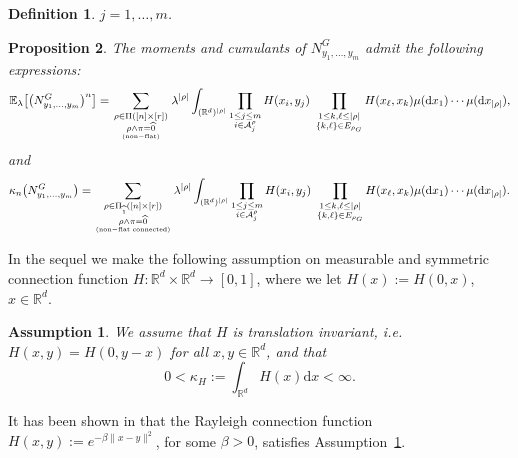 \documentclass[12pt]{article}
\newtheorem{assumption}{Assumption}[section]
\newcommand{\R}{\mathbb{R}}
\newcommand{\E}{\mathbb{E}}
\newtheorem{prop}{Proposition}[section]
\newtheorem{definition}[prop]{Definition}
\def\real{{\mathord{\mathbb R}}}
\numberwithin{equation}{section}
\begin{document}
{\begin{definition}
  $j=1,\ldots , m$.
   \end{definition}
   \begin{prop}
    \label{mom-cumfor}
     The moments and cumulants of $N_{y_1,\ldots , y_m}^G$ admit
     the following expressions: 
    $$
      \E_\lambda \big[\big(N_{y_1,\ldots , y_m}^G\big)^n\big]=
      \sum_{\substack{\rho\in\Pi ([n]\times[r])
          \\\rho\wedge\pi=\widehat{0}} \atop {\rm (non-flat)}}
      \lambda^{|\rho |}
      \int_{(\R^d)^{|\rho|}}\prod_{\substack{ %
          1 \leq j \leq m
          \\ i\in {\cal A}^\rho_j}}
        H(x_i,y_j)
        \ \prod_{
          \substack{1 \leq k , \ell \le|\rho|
            \\
            \{ k , \ell \}\in E_{\rho_G} 
        }}H(x_\ell,x_k)\mu ( \mathrm{d}x_1 ) \cdots \mu ( \mathrm{d}x_{|\rho|}),
        $$
        and
        \begin{equation}
          \label{cumulant-diagram1}
        \kappa_n\big(N_{y_1,\ldots , y_m}^G\big)=
        \sum_{\substack{\rho\in\Pi_{\widehat{1}} ([n]\times[r])
            \\\rho\wedge\pi=\widehat{0}} \atop {\rm (non-flat \ \! connected)}}
      \lambda^{|\rho |}
      \int_{(\R^d)^{|\rho|}}\prod_{
        \substack{%
        1 \leq j \leq m
          \\
        i\in {\cal A}^\rho_j}}  H(x_i,y_j)
      \ \prod_{\substack{
          1\leq k , \ell \le|\rho|
          \\
          \{ k , \ell \}\in E_{\rho_G} }}H(x_\ell,x_k)\mu ( \mathrm{d}x_1)
      \cdots \mu ( \mathrm{d}x_{|\rho|} ).
    \end{equation} 
    \end{prop}
}
In the sequel we make the following assumption on measurable and symmetric 
 connection function $H:\R^d\times\R^d\to[0,1]$,
  where we let $H(x):=H(0,x)$, $x\in \real^d$. 
 \begin{assumption}
  \label{measurability1} 
 We assume that $H$ is translation invariant, i.e. $H(x,y)=H(0,y-x)$ for all $x,y\in\R^d$, and that 
\begin{equation}
  \label{integrability-1}
0<\kappa_H:=\int_{\R^d}H(x)\mathrm{d}x<\infty.
\end{equation}
\end{assumption}
It has been shown in \cite{LiuPrivault23a} that the Rayleigh connection function $H(x,y):=e^{-\beta\|x-y\|^2}$, for some $\beta>0$, satisfies Assumption~\ref{measurability1}. 
\end{document}
